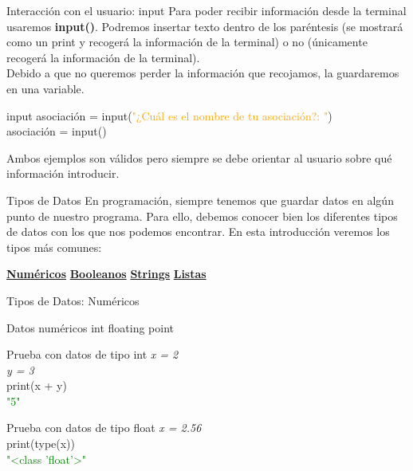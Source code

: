 \documentclass{beamer}
\begin{document}
\begin{frame}{Interacción con el usuario: input}
Para poder recibir información desde la terminal usaremos \textbf{input()}. Podremos insertar texto dentro de los paréntesis (se mostrará como un print y recogerá la información de la terminal) o no (únicamente recogerá la información de la terminal).\\
Debido a que no queremos perder la información que recojamos, la guardaremos en una variable.
\begin{Programexample}{input}
asociación = input(\textcolor{orange}{"¿Cuál es el nombre de tu asociación?: "})\\
asociación = input()
\end{Programexample}
Ambos ejemplos son válidos pero siempre se debe orientar al usuario sobre qué información introducir.
\end{frame}

\begin{frame}{Tipos de Datos}
En programación, siempre tenemos que guardar datos en algún punto de nuestro programa. Para ello, debemos conocer bien los diferentes tipos de datos con los que nos podemos encontrar. En esta introducción veremos los tipos más comunes:
\vspace{1cm}

\centering\hyperlink{datos:numericos}{\textbf{Numéricos}}
\hspace{1cm} \hyperlink{datos:booleanos}{\textbf{Booleanos}}
\hspace{1cm} \hyperlink{datos:strings}{\textbf{Strings}}
\hspace{1cm} \hyperlink{datos:listas}{\textbf{Listas}}
\end{frame}

\begin{frame} {Tipos de Datos: Numéricos}
\label{datos:numericos}
\begin{block}{Datos numéricos}
int
floating point
\end{block}
\begin{Programexample}{Prueba con datos de tipo int}
\centering
\textit{x = 2}\\
\textit{y = 3}\\
print(x + y)\\
\textcolor{green}{"5"}
\end{Programexample}
\begin{Programexample}{Prueba con datos de tipo float}
\centering\textit{x = 2.56}\\
print(type(x)) \\
\textcolor{green}{"<class 'float'>"}
\end{Programexample}
\end{frame}
\end{document}
